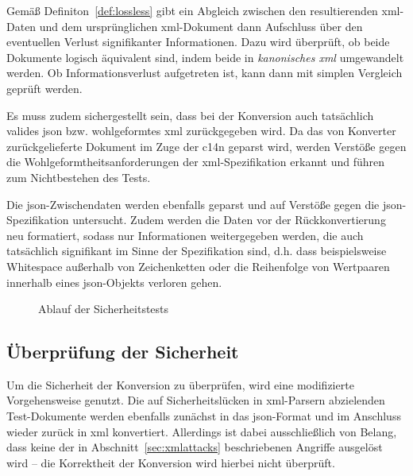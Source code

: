 Gemäß Definiton~\ref{def:lossless} gibt ein Abgleich zwischen den resultierenden \acrshort{xml}-Daten und dem ursprünglichen \acrshort{xml}-Dokument dann Aufschluss über den eventuellen Verlust signifikanter Informationen. Dazu wird überprüft, ob beide Dokumente logisch äquivalent sind, indem beide in \emph{kanonisches \acrshort{xml}} umgewandelt werden. Ob Informationsverlust aufgetreten ist, kann dann mit simplen Vergleich geprüft werden.

Es muss zudem sichergestellt sein, dass bei der Konversion auch tatsächlich valides \acrshort{json} bzw. wohlgeformtes \acrshort{xml} zurückgegeben wird. Da das von Konverter zurückgelieferte Dokument im Zuge der \acrlong{c14n} geparst wird, werden Verstöße gegen die Wohlgeformtheitsanforderungen der \acrshort{xml}-Spezifikation erkannt und führen zum Nichtbestehen des Tests.

Die \acrshort{json}-Zwischendaten werden ebenfalls geparst und auf Verstöße gegen die \acrshort{json}-Spezifikation untersucht. Zudem werden die Daten vor der Rückkonvertierung neu formatiert, sodass nur Informationen weitergegeben werden, die auch tatsächlich signifikant im Sinne der Spezifikation sind, d.h. dass beispielsweise Whitespace außerhalb von Zeichenketten oder die Reihenfolge von Wertpaaren innerhalb eines \acrshort{json}-Objekts verloren gehen.

\begin{figure}[b!]
    \begin{center}
        
        \caption{Ablauf der Sicherheitstests}
    \end{center}
\end{figure}

\subsection{Überprüfung der Sicherheit}
\label{sec:method-sec}

Um die Sicherheit der Konversion zu überprüfen, wird eine modifizierte Vorgehensweise genutzt. Die auf Sicherheitslücken in \acrshort{xml}-Parsern abzielenden Test-Dokumente werden ebenfalls zunächst in das \acrshort{json}-Format und im Anschluss wieder zurück in \acrshort{xml} konvertiert. Allerdings ist dabei ausschließlich von Belang, dass keine der in Abschnitt~\ref{sec:xmlattacks} beschriebenen Angriffe ausgelöst wird -- die Korrektheit der Konversion wird hierbei nicht überprüft.

